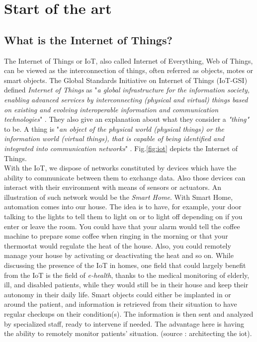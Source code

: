 \part{Start of the art} \label{part:state_art}

\chapter{What is the Internet of Things?}

The Internet of Things or IoT, also called Internet of Everything, Web of Things, can be viewed as the interconnection of things, often referred as objects, motes or smart objects. The Global Standards Initiative on Internet of Things (IoT-GSI) defined \textit{Internet of Things} as "\textit{a global infrastructure for the information society, enabling advanced services by interconnecting (physical and virtual) things based on existing and evolving interoperable information and communication technologies}" \cite{ituitu}. They also give an explanation about what they consider a \textit{"thing"} to be. A thing is "\textit{an object of the physical world (physical things) or the information world (virtual things), that is capable of being identified and integrated into communication networks}" \cite{ituitu}. Fig.\ref{fig:iot} depicts the Internet of Things.\\

With the IoT, we dispose of networks constituted by devices which have the ability to communicate between them to exchange data. Also those devices can interact with their environment with means of sensors or actuators. An illustration of such network would be the \textit{Smart Home}. With Smart Home, automation comes into our house. The idea is to have, for example, your door talking to the lights to tell them to light on or to light off depending on if you enter or leave the room. You could have that your alarm would tell the coffee machine to prepare some coffee when ringing in the morning or that your thermostat would regulate the heat of the house. Also, you could remotely manage your house by activating or deactivating the heat and so on. While discussing the presence of the IoT in homes, one field that could largely benefit from the IoT is the field of \textit{e-health}, thanks to the medical monitoring of elderly, ill, and disabled patients, while they would still be in their house and keep their autonomy in their daily life. Smart objects could either be implanted in or around the patient, and information is retrieved from their situation to have regular checkups on their condition(s). The information is then sent and analyzed by specialized staff, ready to intervene if needed. The advantage here is having the ability to remotely monitor patients' situation. (source : architecting the iot).\\

